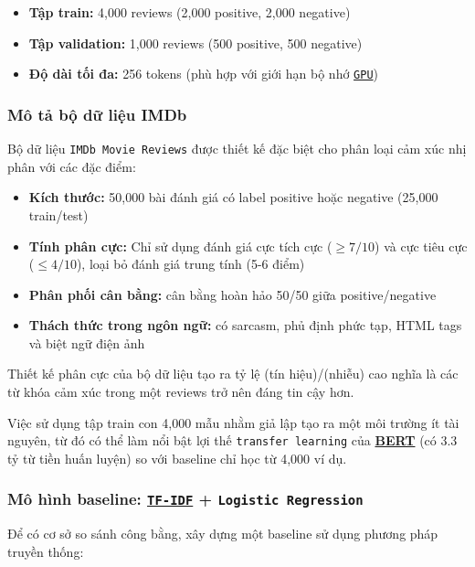 \begin{itemize}
    \item \textbf{Tập train:} 4,000 reviews (2,000 positive, 2,000 negative)
    \item \textbf{Tập validation:} 1,000 reviews (500 positive, 500 negative)
    \item \textbf{Độ dài tối đa:} 256 tokens (phù hợp với giới hạn bộ nhớ \hyperref[acro:gpu]{\texttt{GPU}})
\end{itemize}

\subsubsection{Mô tả bộ dữ liệu IMDb} \label{5.4.2}

Bộ dữ liệu \texttt{IMDb Movie Reviews} \cite{maas2011learning} được thiết kế đặc biệt cho phân loại cảm xúc nhị phân với các đặc điểm:

\begin{itemize}
    \item \textbf{Kích thước:} 50,000 bài đánh giá có label positive hoặc negative  (25,000 train/test)
    \item \textbf{Tính phân cực:} Chỉ sử dụng đánh giá cực tích cực ($\geq 7/10$) và cực tiêu cực ($\leq 4/10$), loại bỏ đánh giá trung tính (5-6 điểm)
    \item \textbf{Phân phối cân bằng:} cân bằng hoàn hảo 50/50 giữa positive/negative
    \item \textbf{Thách thức trong ngôn ngữ:} có sarcasm, phủ định phức tạp, HTML tags và biệt ngữ điện ảnh
\end{itemize}

Thiết kế phân cực của bộ dữ liệu tạo ra tỷ lệ (tín hiệu)/(nhiễu) cao nghĩa là các từ khóa cảm xúc trong một reviews trở nên đáng tin cậy hơn. 

Việc sử dụng tập train con 4,000 mẫu nhằm giả lập tạo ra một môi trường ít tài nguyên, từ đó có thể làm nổi bật lợi thế \texttt{transfer learning} của \hyperref[acro:bert]{\textbf{BERT}} (có 3.3 tỷ từ tiền huấn luyện) so với baseline chỉ học từ 4,000 ví dụ.

\subsubsection{Mô hình baseline: \hyperref[acro:tfidf]{\texttt{TF-IDF}} + \texttt{Logistic Regression}}

Để có cơ sở so sánh công bằng, xây dựng một baseline sử dụng phương pháp truyền thống:

